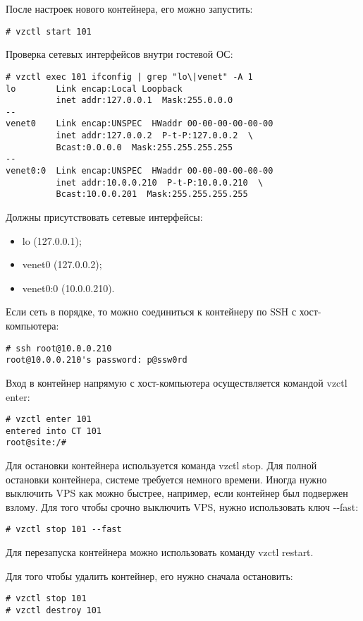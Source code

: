 После настроек нового контейнера, его можно запустить:
\begin{lstlisting}
# vzctl start 101
\end{lstlisting}

Проверка сетевых интерфейсов внутри гостевой ОС:
\begin{lstlisting}
# vzctl exec 101 ifconfig | grep "lo\|venet" -A 1
lo        Link encap:Local Loopback
          inet addr:127.0.0.1  Mask:255.0.0.0
--
venet0    Link encap:UNSPEC  HWaddr 00-00-00-00-00-00
          inet addr:127.0.0.2  P-t-P:127.0.0.2  \
          Bcast:0.0.0.0  Mask:255.255.255.255
--
venet0:0  Link encap:UNSPEC  HWaddr 00-00-00-00-00-00
          inet addr:10.0.0.210  P-t-P:10.0.0.210  \
          Bcast:10.0.0.201  Mask:255.255.255.255
\end{lstlisting}

Должны присутствовать сетевые интерфейсы:
\begin{itemize}
    \item lo (127.0.0.1);
    \item venet0 (127.0.0.2);
    \item venet0:0 (10.0.0.210).
\end{itemize}

Если сеть в порядке, то можно соединиться к контейнеру по SSH с хост-компьютера:
\begin{lstlisting}
# ssh root@10.0.0.210
root@10.0.0.210's password: p@ssw0rd
\end{lstlisting}

Вход в контейнер напрямую с хост-компьютера осуществляется командой vzctl enter:
\begin{lstlisting}
# vzctl enter 101
entered into CT 101
root@site:/#
\end{lstlisting}

Для остановки контейнера используется команда vzctl stop.
Для полной остановки контейнера, системе требуется немного времени.
Иногда нужно выключить VPS как можно быстрее, например, если контейнер был подвержен взлому.
Для того чтобы срочно выключить VPS, нужно использовать ключ -{}-fast:
\begin{lstlisting}
# vzctl stop 101 --fast
\end{lstlisting}

Для перезапуска контейнера можно использовать команду vzctl restart.

Для того чтобы удалить контейнер, его нужно сначала остановить:
\begin{lstlisting}
# vzctl stop 101
# vzctl destroy 101
\end{lstlisting}

